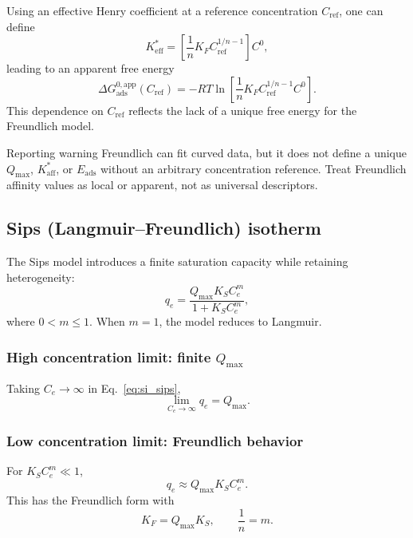 \documentclass[journal=jacsat,manuscript=article]{achemso}
\begin{document}
Using an effective Henry coefficient at a reference concentration
\(C_{\mathrm{ref}}\), one can define
\begin{equation}
	K_{\mathrm{eff}}^{\ast}
	= \left[\frac{1}{n} K_F C_{\mathrm{ref}}^{1/n - 1}\right] C^0,
\end{equation}
leading to an apparent free energy
\begin{equation}
	\Delta G_{\mathrm{ads}}^{0,\mathrm{app}}(C_{\mathrm{ref}})
	= - R T \ln\!\left[
	\frac{1}{n} K_F C_{\mathrm{ref}}^{1/n - 1} C^0 \right].
\end{equation}
This dependence on \(C_{\mathrm{ref}}\) reflects the lack of a unique
free energy for the Freundlich model.

\begin{redbox}{Reporting warning}
	Freundlich can fit curved data, but it does not define a unique
	\(Q_{\max}\), \(K_{\mathrm{aff}}^{\ast}\), or \(E_{\mathrm{ads}}\)
	without an arbitrary concentration reference. Treat Freundlich
	affinity values as local or apparent, not as universal descriptors.
\end{redbox}

\subsection{Sips (Langmuir--Freundlich) isotherm}
\label{sec:si_sips}

The Sips model introduces a finite saturation capacity while retaining
heterogeneity:
\begin{equation}
	q_e = \frac{Q_{\max} K_S C_e^{m}}{1 + K_S C_e^{m}},
	\label{eq:si_sips}
\end{equation}
where \(0 < m \leq 1\). When \(m = 1\), the model reduces to Langmuir.

\subsubsection{High concentration limit: finite \(Q_{\max}\)}

Taking \(C_e \to \infty\) in Eq.~\eqref{eq:si_sips},
\begin{equation}
	\lim_{C_e \to \infty} q_e = Q_{\max}.
\end{equation}

\subsubsection{Low concentration limit: Freundlich behavior}

For \(K_S C_e^{m} \ll 1\),
\begin{equation}
	q_e \approx Q_{\max} K_S C_e^{m}.
\end{equation}
This has the Freundlich form with
\begin{equation}
	K_F = Q_{\max} K_S,
	\qquad \frac{1}{n} = m.
\end{equation}
\end{document}
